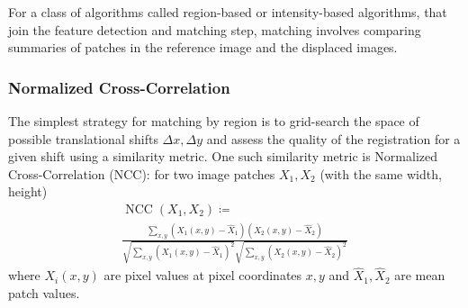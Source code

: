For a class of algorithms called region-based or intensity-based algorithms, that join the feature detection and matching step, matching involves comparing summaries of patches in the reference image and the displaced images.

\subsubsection{Normalized Cross-Correlation}
The simplest strategy for matching by region is to grid-search the space of possible translational shifts \(\Delta x, \Delta y\) and assess the quality of the registration for a given shift using a similarity metric.
%
One such similarity metric is Normalized Cross-Correlation (NCC): for two image patches \(X_1, X_2\) (with the same width, height)
\begin{multline}
	\operatorname{NCC}(X_1, X_2) \coloneqq \\ \frac{\sum_{x,y} \left(X_1(x,y) - \hat{X}_1\right) \left(X_2(x,y) - \hat{X}_2\right)}{\sqrt{\sum_{x,y} \left(X_1(x,y) - \hat{X}_1\right)^2} \sqrt{ \sum_{x,y} \left(X_2(x,y) - \hat{X}_2\right)^2 }}
\end{multline}
where \(X_i(x,y)\) are pixel values at pixel coordinates \(x,y\) and \(\hat{X}_1, \hat{X}_2\) are mean patch values.

